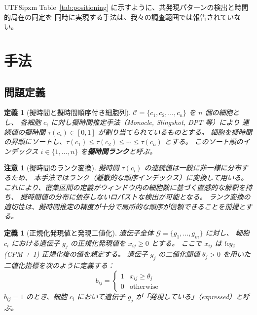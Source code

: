 \documentclass[11pt,a4paper]{article}
\newtheorem{definition}[theorem]{定義}
\newtheorem{remark}[theorem]{注意}
\begin{document}
\begin{CJK}{UTF8}{ipxm}
Table~\ref{tab:positioning} に示すように、共発現パターンの検出と時間的局在の同定を
同時に実現する手法は、我々の調査範囲では報告されていない。

\section{手法}
\label{sec:method}

\subsection{問題定義}

\begin{definition}[擬時間と擬時間順序付き細胞列]
\label{def:pseudotime}
$\mathcal{C} = \{c_1, c_2, \ldots, c_n\}$ を $n$ 個の細胞とし、
各細胞 $c_i$ に対し擬時間推定手法（Monocle, Slingshot, DPT 等）により
連続値の擬時間 $\tau(c_i) \in [0, 1]$ が割り当てられているものとする。
細胞を擬時間の昇順にソートし、$\tau(c_1) \leq \tau(c_2) \leq \cdots \leq \tau(c_n)$ とする。
このソート順のインデックス $i \in \{1, \ldots, n\}$ を\textbf{擬時間ランク}と呼ぶ。
\end{definition}

\begin{remark}[擬時間のランク変換]
擬時間 $\tau(c_i)$ の連続値は一般に非一様に分布するため、
本手法ではランク（離散的な順序インデックス）に変換して用いる。
これにより、密集区間の定義がウィンドウ内の細胞数に基づく直感的な解釈を持ち、
擬時間値の分布に依存しないロバストな検出が可能となる。
ランク変換の適切性は、擬時間推定の精度が十分で局所的な順序が信頼できることを前提とする。
\end{remark}

\begin{definition}[正規化発現値と発現二値化]
\label{def:binarization}
遺伝子全体 $\mathcal{G} = \{g_1, \ldots, g_m\}$ に対し、
細胞 $c_i$ における遺伝子 $g_j$ の正規化発現値を $x_{ij} \geq 0$ とする。
ここで $x_{ij}$ は log$_2$(CPM + 1) 正規化後の値を想定する。
遺伝子 $g_j$ の二値化閾値 $\theta_j > 0$ を用いた二値化指標を次のように定義する：
\begin{equation}
  b_{ij} = \begin{cases} 1 & x_{ij} \geq \theta_j \\ 0 & \text{otherwise} \end{cases}
\end{equation}
$b_{ij} = 1$ のとき、細胞 $c_i$ において遺伝子 $g_j$ が「発現している」（expressed）と呼ぶ。
\end{definition}


\end{CJK}
\end{document}
